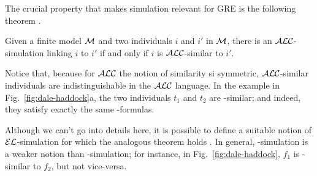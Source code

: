The crucial property that makes simulation relevant for GRE is the
following theorem \cite{blac:moda01}.

\begin{theorem}\label{bisim}
  Given a finite model $\mathcal{M}$ and two individuals $i$ and $i'$ in $\mathcal{M}$, there is an $\mathcal{ALC}$-simulation linking $i$ to $i'$ if and only if $i$ is $\mathcal{ALC}$-similar to $i'$.
\end{theorem}

Notice that, because for $\mathcal{ALC}$ the notion of similarity si symmetric, $\mathcal{ALC}$-similar individuals are indistinguishable in the $\mathcal{ALC}$ language.  In the example in Fig.~\ref{fig:dale-haddock}a,
the two individuals $t_1$ and $t_2$ are \alc-similar; and indeed,
they satisfy exactly the same \alc-formulas.

Although we can't go
into details here, it is possible to define a suitable notion of
$\mathcal{EL}$-simulation for which the analogous theorem holds
\cite{kurt:expr99}.  In general, \el-simulation is a weaker notion
than \alc-simulation; for instance, in Fig.~\ref{fig:dale-haddock},
$f_1$ is \el-similar to $f_2$, but not vice-versa.


